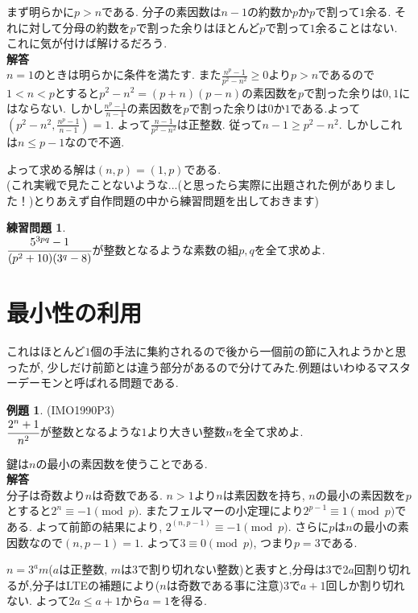 \documentclass{ltjsarticle}
\theoremstyle{definition}
\newtheorem{prob}{練習問題}
\newtheorem{expr}{例題}
\begin{document}
まず明らかに$p>n$である. 分子の素因数は$n-1$の約数か$p$か$p$で割って$1$余る. それに対して分母の約数を$p$で割った余りはほとんど$p$で割って$1$余ることはない. これに気が付けば解けるだろう.\\
\textbf{解答}\\
$n=1$のときは明らかに条件を満たす. また$\displaystyle\frac{n^p-1}{p^2-n^2}\geq0$より$p>n$であるので$1<n<p$とすると$p^2-n^2=(p+n)(p-n)$の素因数を$p$で割った余りは$0,1$にはならない. 
しかし$\displaystyle\frac{n^p-1}{n-1}$の素因数を$p$で割った余りは$0$か$1$である.よって$\displaystyle(p^2-n^2,\frac{n^p-1}{n-1})=1$. よって$\displaystyle\frac{n-1}{p^2-n^2}$は正整数. 従って$n-1\geq p^2-n^2$. しかしこれは$n\leq p-1$なので不適.

よって求める解は$(n,p)=(1,p)$である.\\

(これ実戦で見たことないような...(と思ったら実際に出題された例がありました！)とりあえず自作問題の中から練習問題を出しておきます)

\begin{prob}\ \\
$\cfrac{5^{3pq}-1}{(p^2+10)(3^q-8)}$が整数となるような素数の組$p,q$を全て求めよ.
\end{prob}

\section{最小性の利用}
これはほとんど$1$個の手法に集約されるので後から一個前の節に入れようかと思ったが, 少しだけ前節とは違う部分があるので分けてみた.例題はいわゆるマスターデーモンと呼ばれる問題である.

\begin{expr}(IMO1990P3)\\
$\cfrac{2^n+1}{n^2}$が整数となるような$1$より大きい整数$n$を全て求めよ.
\end{expr}

鍵は$n$の最小の素因数を使うことである.\\
\textbf{解答}\\
分子は奇数より$n$は奇数である. $n>1$より$n$は素因数を持ち, $n$の最小の素因数を$p$とすると$2^{n}\equiv-1\pmod p$. またフェルマーの小定理により$2^{p-1}\equiv1\pmod p$である. よって前節の結果により, $2^{(n,p-1)}\equiv-1\pmod p$. さらに$p$は$n$の最小の素因数なので$(n,p-1)=1$. よって$3\equiv0\pmod p$, つまり$p=3$である.

$n=3^a m$($a$は正整数, $m$は$3$で割り切れない整数)と表すと,分母は$3$で$2a$回割り切れるが,分子はLTEの補題により($n$は奇数である事に注意)$3$で$a+1$回しか割り切れない. よって$2a\leq a+1$から$a=1$を得る. 
\end{document}
